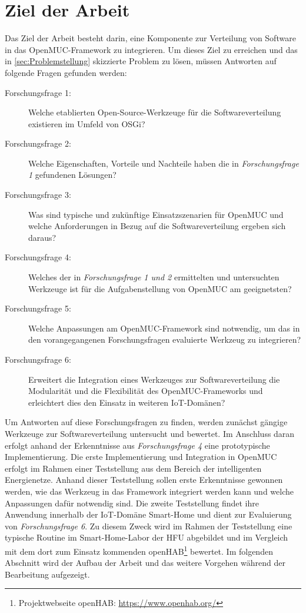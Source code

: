 \section{Ziel der Arbeit}
\label{sec:ziel}
Das Ziel der Arbeit besteht darin, eine Komponente zur Verteilung von Software in das OpenMUC-Framework zu integrieren. 
Um dieses Ziel zu erreichen und das in \autoref{sec:Problemstellung} skizzierte Problem zu lösen, müssen Antworten auf folgende Fragen gefunden werden:

\begin{description}
 \item[Forschungsfrage 1:] Welche etablierten Open-Source-Werkzeuge für die Softwareverteilung existieren im Umfeld von \ac{OSGi}?
 \item[Forschungsfrage 2:] Welche Eigenschaften, Vorteile und Nachteile haben die in \textit{Forschungsfrage 1} gefundenen Lösungen?
 \item[Forschungsfrage 3:] Was sind typische und zukünftige Einsatzszenarien für OpenMUC und welche Anforderungen in Bezug auf die Softwareverteilung ergeben sich daraus?
 \item[Forschungsfrage 4:] Welches der in \textit{Forschungsfrage 1 und 2} ermittelten und untersuchten Werkzeuge ist für die Aufgabenstellung von OpenMUC am geeignetsten?
 \item[Forschungsfrage 5:] Welche Anpassungen am OpenMUC-Framework sind notwendig, um das in den vorangegangenen Forschungsfragen evaluierte Werkzeug zu integrieren?
 \item[Forschungsfrage 6:] Erweitert die Integration eines Werkzeuges zur Softwareverteilung die Modularität und die Flexibilität des OpenMUC-Frameworks und erleichtert dies
 den Einsatz in weiteren \ac{IoT}-Domänen?
\end{description}

Um Antworten auf diese Forschungsfragen zu finden, werden zunächst gängige Werkzeuge zur Softwareverteilung untersucht und bewertet.
Im Anschluss daran erfolgt anhand der Erkenntnisse aus \textit{Forschungsfrage 4} eine prototypische Implementierung.
Die erste Implementierung und Integration in OpenMUC erfolgt im Rahmen einer Teststellung aus dem Bereich der intelligenten Energienetze.
Anhand dieser Teststellung sollen erste Erkenntnisse gewonnen werden, wie das Werkzeug in das Framework integriert werden kann und welche Anpassungen dafür notwendig sind.
Die zweite Teststellung findet ihre Anwendung innerhalb der \ac{IoT}-Domäne Smart-Home und dient zur Evaluierung von \textit{Forschungsfrage 6}.
Zu diesem Zweck wird im Rahmen der Teststellung eine typische Routine im Smart-Home-Labor der \ac{HFU} abgebildet und im Vergleich mit dem dort zum Einsatz
kommenden openHAB\footnote{Projektwebseite openHAB: \url{https://www.openhab.org/}} bewertet.
Im folgenden Abschnitt wird der Aufbau der Arbeit und das weitere Vorgehen während der Bearbeitung aufgezeigt.

